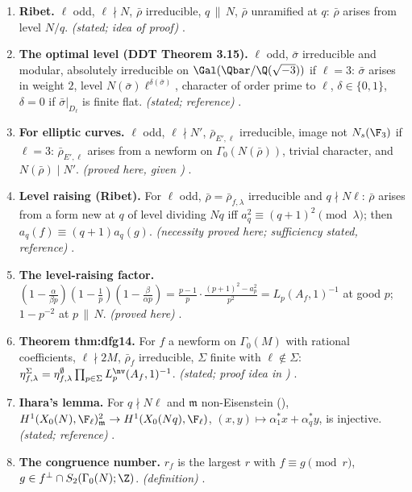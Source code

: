 \begin{enumerate}[label=\textbf{\thechapter.\arabic*}]
.
\item \textbf{Ribet.} $\ell$ odd, $\ell\nmid N$, $\bar\rho$ irreducible, $q\,\|\,N$, $\bar\rho$ unramified at $q$: $\bar\rho$ arises from level $N/q$. \emph{(stated; idea of proof)} .
\item \textbf{The optimal level (DDT Theorem 3.15).} $\ell$ odd, $\bar\sigma$ irreducible and modular, absolutely irreducible on $\Gal(\Qbar/\Q(\sqrt{-3}))$ if $\ell=3$: $\bar\sigma$ arises in weight $2$,
level $N(\bar\sigma)\ell^{\delta(\bar\sigma)}$, character of order prime to $\ell$, $\delta\in\{0,1\}$, $\delta=0$ if $\bar\sigma|_{D_\ell}$ is finite flat. \emph{(stated; reference)} .
\item \textbf{For elliptic curves.} $\ell$ odd, $\ell\nmid N'$, $\bar\rho_{E',\ell}$ irreducible, image not $N_s(\F_3)$ if $\ell=3$: $\bar\rho_{E',\ell}$ arises from a newform on $\Gamma_0(N(\bar\rho))$, trivial character,
and $N(\bar\rho)\mid N'$. \emph{(proved here, given )} .
\item \textbf{Level raising (Ribet).} For $\ell$ odd, $\bar\rho=\bar\rho_{f,\lambda}$ irreducible and $q\nmid N\ell$: $\bar\rho$ arises from a form new at $q$ of level dividing $Nq$ iff $a_q^2\equiv(q+1)^2\pmod\lambda$; then $a_q(f)\equiv(q+1)a_q(g)$. \emph{(necessity
proved here; sufficiency stated, reference)} .
\item \textbf{The level-raising factor.} $(1-\frac\alpha{\beta p})(1-\frac1p)(1-\frac\beta{\alpha p})=\frac{p-1}p\cdot\frac{(p+1)^2-a_p^2}{p^2}=L_p(A_f,1)^{-1}$ at good $p$; $1-p^{-2}$ at $p\,\|\,N$. \emph{(proved here)}
.
\item \textbf{Theorem thm:dfg14.} For $f$ a newform on $\Gamma_0(M)$ with rational coefficients, $\ell\nmid2M$, $\bar\rho_f$ irreducible, $\Sigma$ finite with $\ell\notin\Sigma$:
$\eta^\Sigma_{f,\lambda}=\eta^\emptyset_{f,\lambda}\prod_{p\in\Sigma}L_p^{\nv}(A_f,1)^{-1}$. \emph{(stated; proof idea in )}
.
\item \textbf{Ihara's lemma.} For $q\nmid N\ell$ and $\mathfrak m$ non-Eisenstein (), $H^1(X_0(N),\F_\ell)^2_{\mathfrak m}\to H^1(X_0(Nq),\F_\ell)$, $(x,y)\mapsto\alpha_1^*x+\alpha_q^*y$, is
injective. \emph{(stated; reference)} .
\item \textbf{The congruence number.} $r_f$ is the largest $r$ with $f\equiv g\pmod r$, $g\in f^\perp\cap S_2(\Gamma_0(N);\Z)$. \emph{(definition)} .

\end{enumerate}
